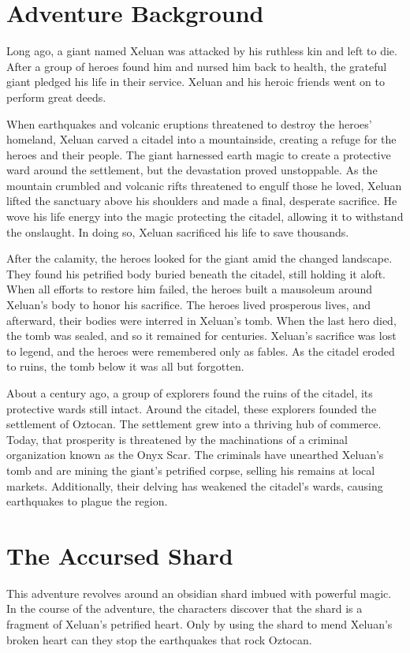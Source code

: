 \documentclass[10pt,a4paper,twoside,bg=print,twocolumn,openany,nodeprecatedcode]{dndbook}
\begin{document}
\section{Adventure Background}
Long ago, a giant named Xeluan was attacked by his ruthless kin and left to die. After a group of heroes found him and nursed him back to health, the grateful giant pledged his life in their service. Xeluan and his heroic friends went on to perform great deeds.

When earthquakes and volcanic eruptions threatened to destroy the heroes' homeland, Xeluan carved a citadel into a mountainside, creating a refuge for the heroes and their people. The giant harnessed earth magic to create a protective ward around the settlement, but the devastation proved unstoppable. As the mountain crumbled and volcanic rifts threatened to engulf those he loved, Xeluan lifted the sanctuary above his shoulders and made a final, desperate sacrifice. He wove his life energy into the magic protecting the citadel, allowing it to withstand the onslaught. In doing so, Xeluan sacrificed his life to save thousands.

After the calamity, the heroes looked for the giant amid the changed landscape. They found his petrified body buried beneath the citadel, still holding it aloft. When all efforts to restore him failed, the heroes built a mausoleum around Xeluan's body to honor his sacrifice. The heroes lived prosperous lives, and afterward, their bodies were interred in Xeluan's tomb. When the last hero died, the tomb was sealed, and so it remained for centuries. Xeluan's sacrifice was lost to legend, and the heroes were remembered only as fables. As the citadel eroded to ruins, the tomb below it was all but forgotten.

About a century ago, a group of explorers found the ruins of the citadel, its protective wards still intact. Around the citadel, these explorers founded the settlement of Oztocan. The settlement grew into a thriving hub of commerce. Today, that prosperity is threatened by the machinations of a criminal organization known as the Onyx Scar. The criminals have unearthed Xeluan's tomb and are mining the giant's petrified corpse, selling his remains at local markets. Additionally, their delving has weakened the citadel's wards, causing earthquakes to plague the region.

\section{The Accursed Shard}
This adventure revolves around an obsidian shard imbued with powerful magic. In the course of the adventure, the characters discover that the shard is a fragment of Xeluan's petrified heart. Only by using the shard to mend Xeluan's broken heart can they stop the earthquakes that rock Oztocan.
\end{document}
